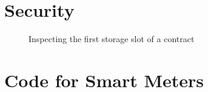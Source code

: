 \begin{appendices}
\chapter{Security}
\begin{figure}[H]
    \centering
    
    \caption{Inspecting the first storage slot of a contract}
    \label{fig:storage}
\end{figure}
\chapter{Code for Smart Meters}

\end{appendices}